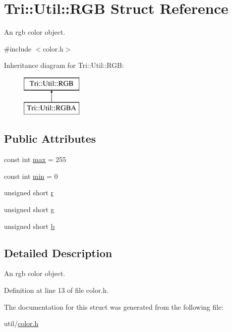 \hypertarget{struct_tri_1_1_util_1_1_r_g_b}{}\section{Tri\+:\+:Util\+:\+:R\+G\+B Struct Reference}
\label{struct_tri_1_1_util_1_1_r_g_b}


An rgb color object.  




{\ttfamily \#include $<$color.\+h$>$}

Inheritance diagram for Tri\+:\+:Util\+:\+:R\+G\+B\+:\begin{figure}[H]
\begin{center}
\leavevmode
\includegraphics[height=2.000000cm]{struct_tri_1_1_util_1_1_r_g_b}
\end{center}
\end{figure}
\subsection*{Public Attributes}
\begin{DoxyCompactItemize}
\item 
const int \hyperlink{group__lus__color_ga45ab730fe9bc39935d679e4a65a55292}{max} = 255
\item 
const int \hyperlink{group__lus__color_gac765b8ca5b32b9228bd71fa30e66955f}{min} = 0
\item 
unsigned short \hyperlink{group__lus__color_gab1905470bfa9e2bd85fcc53b45e6587c}{r}
\item 
unsigned short \hyperlink{group__lus__color_ga0feb7cf657a0256c05aa23257ff38b38}{g}
\item 
unsigned short \hyperlink{group__lus__color_gaa434512797df3728a5cb66c4ee2aab65}{b}
\end{DoxyCompactItemize}


\subsection{Detailed Description}
An rgb color object. 

Definition at line 13 of file color.\+h.



The documentation for this struct was generated from the following file\+:\begin{DoxyCompactItemize}
\item 
util/\hyperlink{color_8h}{color.\+h}\end{DoxyCompactItemize}
